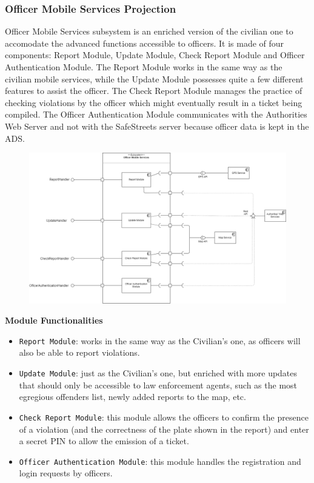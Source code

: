 \documentclass[12pt,a4paper]{article}
\begin{document}
\subsubsection{Officer Mobile Services Projection}
Officer Mobile Services subsystem is an enriched version of the civilian one to accomodate the advanced functions accessible to officers. It is made of four components: Report Module, Update Module, Check Report Module and Officer Authentication Module.
The Report Module works in the same way as the civilian mobile services, while the Update Module possesses quite a few different features to assist the officer. The Check Report Module manages the practice of checking violations by the officer
which might eventually result in a ticket being compiled. The Officer Authentication Module communicates with the Authorities Web Server and not with the SafeStreets server because officer data is kept in the ADS. 
\begin{figure}[H]
				\centering
					\begin{adjustwidth}{-25mm}{-25mm}
					        \includegraphics[width=0.9\paperwidth]{Images/OfficerMobileServicesProjection}
					\end{adjustwidth}
			\end{figure}
\newpage
\textbf{Module Functionalities}
\begin{itemize}
	\item \texttt{Report Module}: works in the same way as the Civilian's one, as officers will also be able to report violations.
	\item \texttt{Update Module}: just as the Civilian's one, but enriched with more updates that should only be accessible to law enforcement agents, such as the most egregious offenders list, newly added reports to the map, etc.
	\item \texttt{Check Report Module}: this module allows the officers to confirm the presence of a violation (and the correctness of the plate shown in the report) and enter a secret PIN to allow the emission of a ticket.
	\item \texttt{Officer Authentication Module}: this module handles the registration and login requests by officers.

\end{itemize}
\newpage
\end{document}
